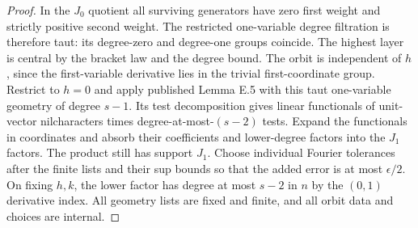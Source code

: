 \documentclass[11pt]{article}
\begin{document}
\begin{proof}
In the $J_0$ quotient all surviving generators have zero first
weight and strictly positive second weight. The restricted
one-variable degree filtration is therefore taut: its degree-zero
and degree-one groups coincide. The highest layer is central by
the bracket law and the degree bound. The orbit is independent
of $h$, since the first-variable derivative lies in the trivial
first-coordinate group. Restrict to $h=0$ and apply published
Lemma E.5 with this taut one-variable geometry of degree $s-1$.
Its test decomposition gives linear functionals of unit-vector
nilcharacters times degree-at-most-$(s-2)$ tests. Expand the
functionals in coordinates and absorb their coefficients and
lower-degree factors into the $J_1$ factors. The product still
has support $J_1$. Choose individual Fourier tolerances after
the finite lists and their sup bounds so that the added error
is at most $\epsilon/2$. On fixing $h,k$, the lower factor has
degree at most $s-2$ in $n$ by the $(0,1)$ derivative index.
All geometry lists are fixed and finite, and all orbit data
and choices are internal.
\end{proof}
\end{document}
